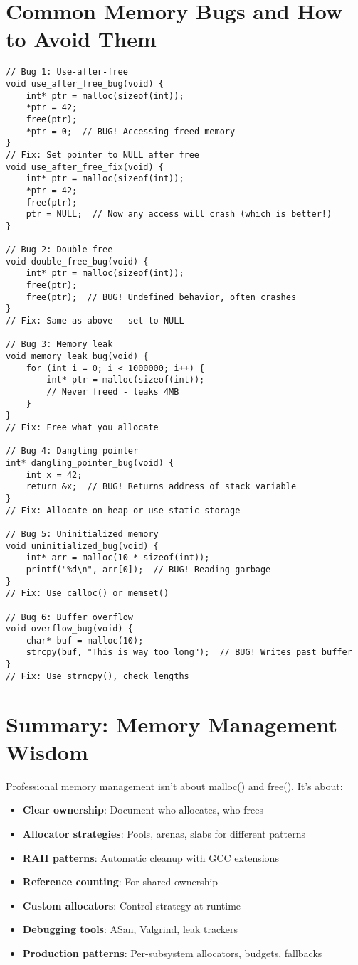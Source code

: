 \section{Common Memory Bugs and How to Avoid Them}

\begin{lstlisting}
// Bug 1: Use-after-free
void use_after_free_bug(void) {
    int* ptr = malloc(sizeof(int));
    *ptr = 42;
    free(ptr);
    *ptr = 0;  // BUG! Accessing freed memory
}
// Fix: Set pointer to NULL after free
void use_after_free_fix(void) {
    int* ptr = malloc(sizeof(int));
    *ptr = 42;
    free(ptr);
    ptr = NULL;  // Now any access will crash (which is better!)
}

// Bug 2: Double-free
void double_free_bug(void) {
    int* ptr = malloc(sizeof(int));
    free(ptr);
    free(ptr);  // BUG! Undefined behavior, often crashes
}
// Fix: Same as above - set to NULL

// Bug 3: Memory leak
void memory_leak_bug(void) {
    for (int i = 0; i < 1000000; i++) {
        int* ptr = malloc(sizeof(int));
        // Never freed - leaks 4MB
    }
}
// Fix: Free what you allocate

// Bug 4: Dangling pointer
int* dangling_pointer_bug(void) {
    int x = 42;
    return &x;  // BUG! Returns address of stack variable
}
// Fix: Allocate on heap or use static storage

// Bug 5: Uninitialized memory
void uninitialized_bug(void) {
    int* arr = malloc(10 * sizeof(int));
    printf("%d\n", arr[0]);  // BUG! Reading garbage
}
// Fix: Use calloc() or memset()

// Bug 6: Buffer overflow
void overflow_bug(void) {
    char* buf = malloc(10);
    strcpy(buf, "This is way too long");  // BUG! Writes past buffer
}
// Fix: Use strncpy(), check lengths
\end{lstlisting}

\section{Summary: Memory Management Wisdom}

Professional memory management isn't about malloc() and free(). It's about:

\begin{itemize}
    \item \textbf{Clear ownership}: Document who allocates, who frees
    \item \textbf{Allocator strategies}: Pools, arenas, slabs for different patterns
    \item \textbf{RAII patterns}: Automatic cleanup with GCC extensions
    \item \textbf{Reference counting}: For shared ownership
    \item \textbf{Custom allocators}: Control strategy at runtime
    \item \textbf{Debugging tools}: ASan, Valgrind, leak trackers
    \item \textbf{Production patterns}: Per-subsystem allocators, budgets, fallbacks
\end{itemize}

